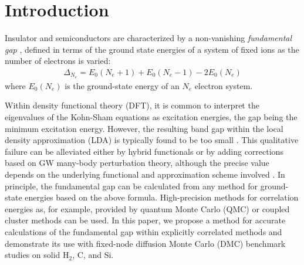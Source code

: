 \newcommand \beq{\begin{eqnarray}}
\newcommand \eeq{\end{eqnarray}}
\newcommand \bea{\begin{eqnarray}}
\newcommand \eea{\end{eqnarray}}
\newcommand \avec{{\bf a}}
\newcommand \kvec{{\bf k}}
\newcommand \lvec{{\bf l}}
\newcommand \qvec{{\bf q}}
\newcommand \pvec{{\bf p}}
\newcommand \hvec{{\bf h}}
\newcommand \nvec{{\bf n}}
\newcommand \xvec{{\bf x}}
\newcommand\rvec{{\bf r}}
\newcommand\yvec{{\bf y}}
\newcommand\Rvec{{\bf R}}
\newcommand\Pvec{{\bf P}}
\newcommand\Qvec{{\bf Q}}
\newcommand\Gvec{{\bf G}}
\newcommand\Kvec{{\bf K}}
\def\simge{\mathrel{%
       \rlap{\raise 0.511ex \hbox{$>$}}{\lower 0.511ex \hbox{$\sim$}}}}
\def\simle{\mathrel{
       \rlap{\raise 0.511ex \hbox{$<$}}{\lower 0.511ex \hbox{$\sim$}}}}

\section{Introduction}
Insulator and semiconductors are characterized by a non-vanishing {\it fundamental gap}
\cite{book}, 
defined in terms of the ground state energies of a system of fixed ions as the number of electrons is varied:
\beq
\Delta_{N_e} = E_0(N_e+1)+ E_0(N_e-1)- 2 E_0(N_e)
\label{gap}
\eeq
where $E_0(N_e)$ is the ground-state energy of an $N_e$ electron system.

Within density functional theory (DFT), it is common to interpret the eigenvalues of the
Kohn-Sham equations as excitation energies, the gap being the minimum excitation energy. However, the resulting band gap
within the local density approximation (LDA) is typically found to be too small \cite{Perdew}.
This qualitative failure can be alleviated
either by hybrid functionals or by adding corrections based on GW many-body perturbation theory,
although the precise value depends on the underlying functional and approximation scheme involved \cite{book}.
In principle, the fundamental gap can be calculated from any method for ground-state energies
based on the above formula.
High-precision methods for correlation energies as, for example, provided
by quantum Monte Carlo (QMC) \cite{rev1,rev2,rev3,Ruggeri18} or coupled cluster methods
\cite{Shepherd13,Gruber18} can be used.  
In this paper, we propose a method for accurate calculations of the fundamental gap
within explicitly correlated methods and demonstrate its use with fixed-node diffusion Monte Carlo (DMC) benchmark studies on solid H$_2$,  C, and Si.

